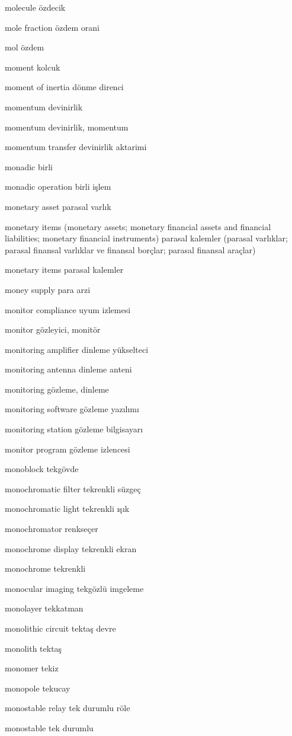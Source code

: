 \documentclass[12pt,fleqn]{article}\usepackage{../../common}
\begin{document}
molecule özdecik

mole fraction özdem orani

mol özdem

moment kolcuk

moment of inertia dönme direnci

momentum devinirlik

momentum devinirlik, momentum

momentum transfer devinirlik aktarimi

monadic birli

monadic operation birli işlem

monetary asset parasal varlık

monetary items (monetary assets; monetary financial assets and financial liabilities; monetary financial instruments) parasal kalemler (parasal varlıklar; parasal finansal varlıklar ve finansal borçlar; parasal finansal araçlar)

monetary items parasal kalemler

money supply para arzi

monitor compliance uyum izlemesi

monitor gözleyici, monitör

monitoring amplifier dinleme yükselteci

monitoring antenna dinleme anteni

monitoring gözleme, dinleme

monitoring software gözleme yazılımı

monitoring station gözleme bilgisayarı

monitor program gözleme izlencesi

monoblock tekgövde

monochromatic filter tekrenkli süzgeç

monochromatic light tekrenkli ışık

monochromator renkseçer

monochrome display tekrenkli ekran

monochrome tekrenkli

monocular imaging tekgözlü imgeleme

monolayer tekkatman

monolithic circuit tektaş devre

monolith tektaş

monomer tekiz

monopole tekucay

monostable relay tek durumlu röle

monostable tek durumlu
\end{document}
